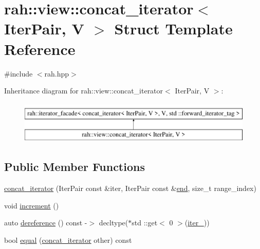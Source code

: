 \hypertarget{structrah_1_1view_1_1concat__iterator}{}\section{rah\+::view\+::concat\+\_\+iterator$<$ Iter\+Pair, V $>$ Struct Template Reference}
\label{structrah_1_1view_1_1concat__iterator}


{\ttfamily \#include $<$rah.\+hpp$>$}

Inheritance diagram for rah\+::view\+::concat\+\_\+iterator$<$ Iter\+Pair, V $>$\+:\begin{figure}[H]
\begin{center}
\leavevmode
\includegraphics[height=2.000000cm]{structrah_1_1view_1_1concat__iterator}
\end{center}
\end{figure}
\subsection*{Public Member Functions}
\begin{DoxyCompactItemize}
\item 
\mbox{\hyperlink{structrah_1_1view_1_1concat__iterator_a45e7ea9b72e7df5390a2ae09a6923d11}{concat\+\_\+iterator}} (Iter\+Pair const \&iter, Iter\+Pair const \&\mbox{\hyperlink{namespacerah_aaddd1442cd76b96876e692cdefe7261d}{end}}, size\+\_\+t range\+\_\+index)
\item 
void \mbox{\hyperlink{structrah_1_1view_1_1concat__iterator_a6301909457da06a9894f4681353442b4}{increment}} ()
\item 
auto \mbox{\hyperlink{structrah_1_1view_1_1concat__iterator_a8449f70baf374fb27f6cf7dbb80e2d17}{dereference}} () const -\/$>$ decltype($\ast$std \+::get$<$ 0 $>$(\mbox{\hyperlink{structrah_1_1view_1_1concat__iterator_affb17b45b66a04b01962c8b84dc20c43}{iter\+\_\+}}))
\item 
bool \mbox{\hyperlink{structrah_1_1view_1_1concat__iterator_a6e8021ecde205f2ceba2c167a6954d05}{equal}} (\mbox{\hyperlink{structrah_1_1view_1_1concat__iterator}{concat\+\_\+iterator}} other) const
\end{DoxyCompactItemize}
